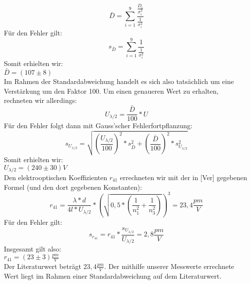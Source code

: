 \[\bar{D}=\sum\limits_{i=1}^{9}\frac{\frac{D_{i}}{\sigma_{i}^{2}}}{\frac{1}{\sigma_{i}^{2}}}\]
Für den Fehler gilt: \\
\[s_{\bar{D}}=\sum\limits_{i=1}^{9}\frac{1}{\frac{1}{\sigma_{i}^{2}}}\]
Somit erhielten wir: \\
$\bar{D}=(107\pm8)$\\
Im Rahmen der Standardabweichung handelt es sich also tatsächlich um eine Verstärkung um den Faktor 100. Um einen genaueren Wert zu erhalten, rechneten wir allerdings:\\
\[U_{\lambda/2}=\frac{\bar{D}}{100}*U\]
Für den Fehler folgt dann mit Gauss'scher Fehlerfortpflanzung:\\
\[s_{U_{\lambda/2}}=\sqrt{(\frac{U_{\lambda/2}}{100})^{2}*s_{\bar{D}}^{2}+(\frac{\bar{D}}{100})^{2}*s_{U_{\lambda/2}}^{2}}\]
Somit erhielten wir:\\
$U_{\lambda/2}=(240\pm30)V$\\
Den elektrooptischen Koeffizienten $r_{41}$ errechneten wir mit der in [Ver] gegebenen Formel (und den dort gegebenen Konstanten):\\
\[r_{41}=\frac{\lambda*d}{4l*U_{\lambda/2}}*\left(\sqrt{0,5*(\frac{1}{n_{1}^{2}}+\frac{1}{n_{3}^{2}})}\right)^{3}=23,4 \frac{pm}{V}\]
Für den Fehler gilt:\\
\[s_{r_{41}}=r_{41}*\frac{s_{U_{\lambda/2}}}{U_{\lambda/2}}=2,8 \frac{pm}{V}\]
Insgesamt gilt also:\\
$r_{41}=(23\pm3)\frac{pm}{V}$\\
Der Literaturwert beträgt $23,4\frac{pm}{V}$. Der mithilfe unserer Messwerte errechnete Wert liegt im Rahmen einer Standardabweichung auf dem Literaturwert. 

